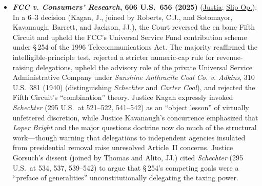 \documentclass[12pt]{article}
\begin{document}
\begin{itemize}
\item \textbf{\textit{FCC v. Consumers' Research}, 606 U.S.\ 656 (2025)} (\href{https://supreme.justia.com/cases/federal/us/606/24-354/}{Justia}; \href{https://www.supremecourt.gov/opinions/24pdf/24-354_0861.pdf}{Slip Op.}): In a 6--3 decision (Kagan, J., joined by Roberts, C.J., and Sotomayor, Kavanaugh, Barrett, and Jackson, JJ.), the Court reversed the en banc Fifth Circuit and upheld the FCC's Universal Service Fund contribution scheme under \S\,254 of the 1996 Telecommunications Act. The majority reaffirmed the intelligible-principle test, rejected a stricter numeric-cap rule for revenue-raising delegations, upheld the advisory role of the private Universal Service Administrative Company under \textit{Sunshine Anthracite Coal Co. v. Adkins}, 310 U.S.\ 381 (1940) (distinguishing \textit{Schechter} and \textit{Carter Coal}), and rejected the Fifth Circuit's ``combination'' theory. Justice Kagan expressly invoked \textit{Schechter} (295 U.S.\ at 521--522, 541--542) as an ``object lesson'' of virtually unfettered discretion, while Justice Kavanaugh's concurrence emphasized that \textit{Loper Bright} and the major questions doctrine now do much of the structural work---though warning that delegations to independent agencies insulated from presidential removal raise unresolved Article~II concerns. Justice Gorsuch's dissent (joined by Thomas and Alito, JJ.) cited \textit{Schechter} (295 U.S.\ at 534, 537, 539--542) to argue that \S\,254's competing goals were a ``preface of generalities'' unconstitutionally delegating the taxing power.

\end{itemize}
\end{document}

